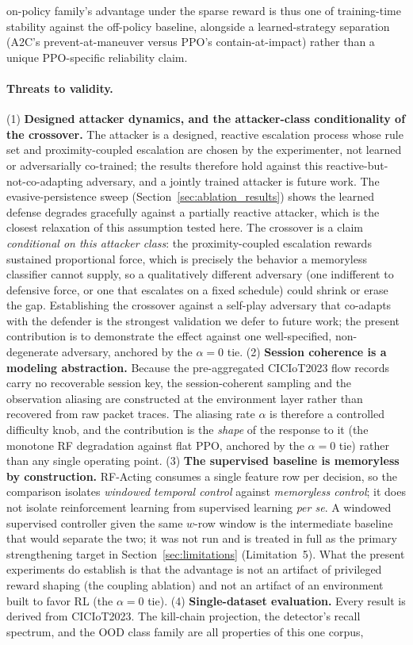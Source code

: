 on-policy family's advantage under the sparse reward is thus one of training-time stability against the off-policy baseline, alongside a learned-strategy separation (A2C's prevent-at-maneuver versus PPO's contain-at-impact) rather than a unique PPO-specific reliability claim.

\paragraph{Threats to validity.}\label{sec:threats_to_validity} (1) \textbf{Designed attacker dynamics, and the attacker-class conditionality of the crossover.} The attacker is a designed, reactive escalation process whose rule set and proximity-coupled escalation are chosen by the experimenter, not learned or adversarially co-trained; the results therefore hold against this reactive-but-not-co-adapting adversary, and a jointly trained attacker is future work. The evasive-persistence sweep (Section~\ref{sec:ablation_results}) shows the learned defense degrades gracefully against a partially reactive attacker, which is the closest relaxation of this assumption tested here. The crossover is a claim \emph{conditional on this attacker class}: the proximity-coupled escalation rewards sustained proportional force, which is precisely the behavior a memoryless classifier cannot supply, so a qualitatively different adversary (one indifferent to defensive force, or one that escalates on a fixed schedule) could shrink or erase the gap. Establishing the crossover against a self-play adversary that co-adapts with the defender is the strongest validation we defer to future work; the present contribution is to demonstrate the effect against one well-specified, non-degenerate adversary, anchored by the $\alpha=0$ tie. (2) \textbf{Session coherence is a modeling abstraction.} Because the pre-aggregated CICIoT2023 flow records carry no recoverable session key, the session-coherent sampling and the observation aliasing are constructed at the environment layer rather than recovered from raw packet traces. The aliasing rate $\alpha$ is therefore a controlled difficulty knob, and the contribution is the \emph{shape} of the response to it (the monotone RF degradation against flat PPO, anchored by the $\alpha = 0$ tie) rather than any single operating point. (3) \textbf{The supervised baseline is memoryless by construction.} RF-Acting consumes a single feature row per decision, so the comparison isolates \emph{windowed temporal control} against \emph{memoryless control}; it does not isolate reinforcement learning from supervised learning \emph{per se}. A windowed supervised controller given the same $w$-row window is the intermediate baseline that would separate the two; it was not run and is treated in full as the primary strengthening target in Section~\ref{sec:limitations} (Limitation~5). What the present experiments do establish is that the advantage is not an artifact of privileged reward shaping (the coupling ablation) and not an artifact of an environment built to favor RL (the $\alpha=0$ tie). (4) \textbf{Single-dataset evaluation.} Every result is derived from CICIoT2023. The kill-chain projection, the detector's recall spectrum, and the OOD class family are all properties of this one corpus, 
